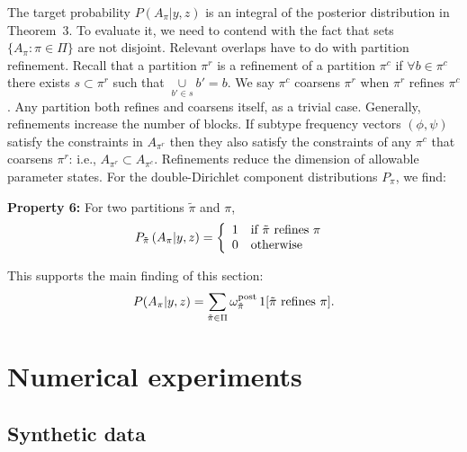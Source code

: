 \documentclass[aoas,preprint]{imsart}
\begin{document}
The target probability $P(A_\pi|y,z)$ is an integral of the posterior distribution in Theorem~3.
To evaluate it, we need to contend with the fact that sets $\{ A_\pi: \pi \in \Pi \}$ are not disjoint.
Relevant overlaps have to do with partition refinement.  Recall 
that a  partition $\pi^r$ is a refinement of a partition $\pi^c$ if $\forall b \in \pi^c$ there 
exists $s \subset \pi^r$  such that $\underset{b'\in s}\cup b' = b$. 
We say $\pi^c$  coarsens $\pi^r$ when $\pi^r$ refines $\pi^c$. Any partition both
refines and coarsens itself, as a trivial case. 
Generally, refinements increase the number of blocks.
 If subtype frequency vectors $(\phi,\psi)$
satisfy the constraints in $A_{\pi^r}$ then they also satisfy the constraints of any $\pi^c$
that coarsens $\pi^r$: i.e., $A_{\pi^r} \subset A_{\pi^c}$.  
Refinements reduce the dimension of allowable parameter states. 
 For the double-Dirichlet
component distributions $P_\pi$, we find:

\noindent
{\bf Property 6:} For two partitions $\tilde \pi$ and $\pi$,  
\begin{eqnarray*}
P_{\tilde \pi}\left( A_{\pi} | y,z \right) = \left\{  \begin{array}{ll}
     1  & {\mbox {\rm if $\tilde \pi$ refines $\pi$ }} \\ 
     0  & {\mbox {\rm otherwise }} \\ 
                                                   \end{array}
   \right.
\end{eqnarray*}


This supports the main finding of this section:
\begin{eqnarray}
P(A_\pi|y,z) = 
\sum_{\tilde \pi \in \Pi} \omega^{\rm post}_{\tilde \pi} \,  1[ {\mbox {\rm $\tilde \pi$ refines $\pi$}} ].
\end{eqnarray}



 
\section{Numerical experiments}

\subsection{Synthetic data} 
\end{document}
